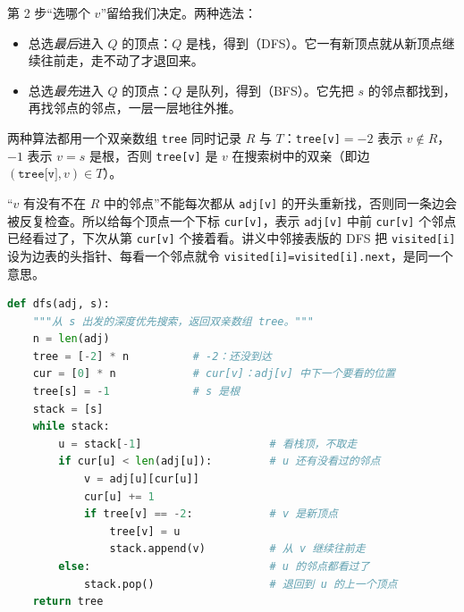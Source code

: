 第 2 步“选哪个 $v$”留给我们决定。两种选法：
\begin{itemize}
\item 总选\emph{最后}进入 $Q$ 的顶点：$Q$ 是栈，得到（DFS）。它一有新顶点就从新顶点继续往前走，走不动了才退回来。
\item 总选\emph{最先}进入 $Q$ 的顶点：$Q$ 是队列，得到（BFS）。它先把 $s$ 的邻点都找到，再找邻点的邻点，一层一层地往外推。
\end{itemize}

两种算法都用一个双亲数组 \texttt{tree} 同时记录 $R$ 与 $T$：\texttt{tree[v]}$=-2$ 表示 $v\notin R$，$-1$ 表示 $v=s$ 是根，否则 \texttt{tree[v]} 是 $v$ 在搜索树中的双亲（即边 $(\texttt{tree[v]},v)\in T$）。


“$v$ 有没有不在 $R$ 中的邻点”不能每次都从 \texttt{adj[v]} 的开头重新找，否则同一条边会被反复检查。所以给每个顶点一个下标 \texttt{cur[v]}，表示 \texttt{adj[v]} 中前 \texttt{cur[v]} 个邻点已经看过了，下次从第 \texttt{cur[v]} 个接着看。讲义中邻接表版的 DFS 把 \texttt{visited[i]} 设为边表的头指针、每看一个邻点就令 \texttt{visited[i]=visited[i].next}，是同一个意思。

\begin{lstlisting}[language=Python]
def dfs(adj, s):
    """从 s 出发的深度优先搜索，返回双亲数组 tree。"""
    n = len(adj)
    tree = [-2] * n          # -2：还没到达
    cur = [0] * n            # cur[v]：adj[v] 中下一个要看的位置
    tree[s] = -1             # s 是根
    stack = [s]
    while stack:
        u = stack[-1]                    # 看栈顶，不取走
        if cur[u] < len(adj[u]):         # u 还有没看过的邻点
            v = adj[u][cur[u]]
            cur[u] += 1
            if tree[v] == -2:            # v 是新顶点
                tree[v] = u
                stack.append(v)          # 从 v 继续往前走
        else:                            # u 的邻点都看过了
            stack.pop()                  # 退回到 u 的上一个顶点
    return tree
\end{lstlisting}

